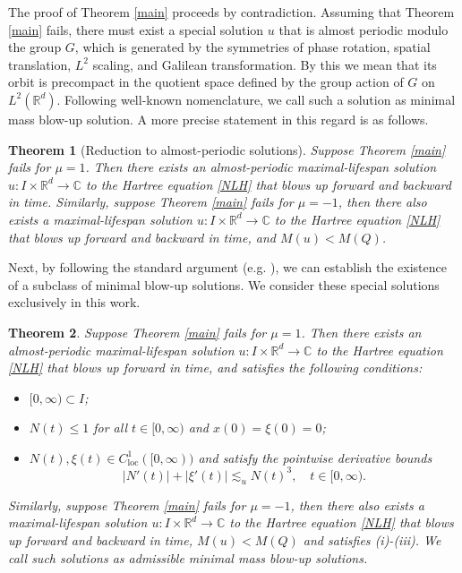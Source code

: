 \documentclass[reqno,11pt]{amsart}
\theoremstyle{plain}
\newtheorem{theorem}{Theorem}
\theoremstyle{definition}
\numberwithin{equation}{section}
\numberwithin{theorem}{section}
\def\leq{\leqslant}
\def\R{\mathbb{R}}
\begin{document}
The proof of Theorem \ref{main} proceeds by contradiction. Assuming that Theorem \ref{main} fails, there must exist a special solution $u$ that is almost periodic modulo the group $G$, which is generated by the symmetries of phase rotation, spatial translation, $L^2$ scaling, and Galilean transformation. By this we mean that its orbit is precompact in the quotient space defined by the group action of $G$ on $L^2(\mathbb{R}^d)$. Following well-known nomenclature, we call such a solution as minimal mass blow-up solution. A more precise statement in this regard is as follows.

\begin{theorem}[Reduction to almost-periodic solutions] \label{thm:reduction_ap}
Suppose Theorem \ref{main} fails for $\mu=1$. Then  there exists an almost-periodic maximal-lifespan solution $u: I \times \R^d \rightarrow \mathbb{C}$ to the Hartree equation \eqref{NLH} that blows up forward and backward in time. 
Similarly, suppose Theorem \ref{main} fails for $\mu=-1$, then there also exists a maximal-lifespan solution $u: I \times \R^d \rightarrow \mathbb{C}$ to the Hartree equation \eqref{NLH} that blows up forward and backward in time, and $M(u)<M(Q)$.
\end{theorem}

Next, by following the standard argument (e.g. \cite{Dodson,KV,TVZ-Forum}), we can establish the existence of a subclass of minimal blow-up solutions. We consider these special solutions exclusively in this work.

\begin{theorem}
Suppose Theorem \ref{main} fails for $\mu=1$. Then  there exists an almost-periodic maximal-lifespan solution $u: I \times \R^d \rightarrow \mathbb{C}$ to the Hartree equation \eqref{NLH} that blows up forward  in time, and satisfies the following conditions:
\begin{itemize}
\item[\textup{(i)}]  $[0, \infty) \subset I$;
    
\item[\textup{(ii)}]  $N(t) \leq 1$ for all $t \in[0, \infty)$ and $x(0) = \xi(0) = 0$;
    
\item[\textup{(iii)}] $N(t), \xi(t) \in C_{\mathrm{loc}}^1([0, \infty))$ and satisfy the pointwise derivative bounds
\begin{equation*}
\left|N'(t)\right| + \left|\xi'(t)\right| \lesssim_u N(t)^3, \quad t \in [0, \infty).
\end{equation*}
\end{itemize}
Similarly, suppose Theorem \ref{main} fails for $\mu=-1$, then there also exists a maximal-lifespan solution $u: I \times \R^d \rightarrow \mathbb{C}$ to the Hartree equation \eqref{NLH} that blows up forward and backward in time, $M(u)<M(Q)$ and satisfies \textup{(i)-(iii)}. We call such solutions as admissible minimal mass blow-up solutions.
\end{theorem}
\end{document}
